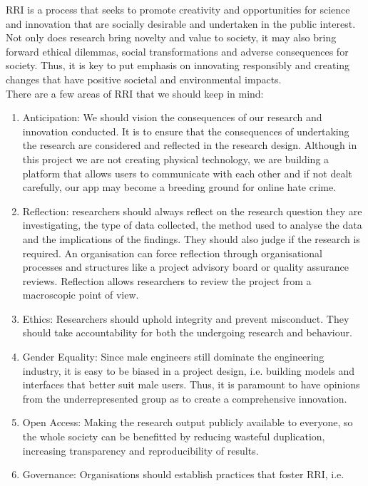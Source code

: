 RRI is a process that seeks to promote creativity and opportunities for science and innovation that are socially desirable and undertaken in the public interest. Not only does research bring novelty 
and value to society, it may also bring forward ethical dilemmas, social transformations and adverse consequences for society. Thus, it is key to put emphasis on innovating responsibly and creating changes that
have positive societal and environmental impacts.\\ There are a few areas of RRI that we should keep in mind:
\begin{enumerate}
    \item Anticipation: We should vision the consequences of our research and innovation conducted. It is to ensure that the consequences of undertaking the research are considered and reflected in the research 
    design. Although in this project we are not creating physical technology, we are building a platform that allows users to communicate with each other and if not dealt carefully, our app may become a breeding 
    ground for online hate crime.
    \item Reflection: researchers should always reflect on the research question they are investigating, the type of data collected, the method used to analyse the data and the implications of the findings.
    They should also judge if the research is required. An organisation can force reflection through organisational processes and structures like a project advisory board or quality assurance reviews. Reflection 
    allows researchers to review the project from a macroscopic point of view.
    \item Ethics: Researchers should uphold integrity and prevent misconduct. They should take accountability for both the undergoing research and behaviour.
    \item Gender Equality: Since male engineers still dominate the engineering industry, it is easy to be biased in a project design, i.e. building models and interfaces that better suit male users. Thus, it is 
    paramount to have opinions from the underrepresented group as to create a comprehensive innovation.
    \item Open Access: Making the research output publicly available to everyone, so the whole society can be benefitted by reducing wasteful duplication, increasing transparency and reproducibility of results.
    \item Governance: Organisations should establish practices that foster RRI, i.e. 

\end{enumerate}
